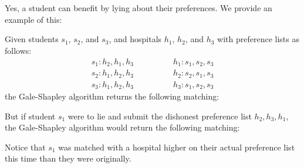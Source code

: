 \documentclass[11pt]{article}
\begin{document}
\renewcommand{\thesubsection}{\thesection.\roman{subsection}}
\section{} %
Yes, a student can benefit by lying about their preferences.
We provide an example of this:

Given students $s_1$, $s_2$, and $s_3$, and hospitals $h_1$, $h_2$, and $h_3$ with preference lists as follows:
\begin{align*}
	s_1: h_2, h_1, h_3 &\qquad\qquad h_1: s_1, s_2, s_3 \\
	s_2: h_1, h_2, h_3 &\qquad\qquad h_2: s_2, s_1, s_3 \\
	s_3: h_1, h_2, h_3 &\qquad\qquad h_3: s_1, s_2, s_3
\end{align*}
the Gale-Shapley algorithm returns the following matching:
\newline
\newline
\begin{figure}[h]
\centering
{}
\end{figure}
\newline
But if student $s_1$ were to lie and submit the dishonest preference list $h_2,h_3,h_1$, the Gale-Shapley algorithm would return the following matching:
\newline
\newline
\begin{figure}[h]
\centering
{}
\end{figure}
\newline
Notice that $s_1$ was matched with a hospital higher on their actual preference list this time than they were originally.


\section{} %
\end{document}
